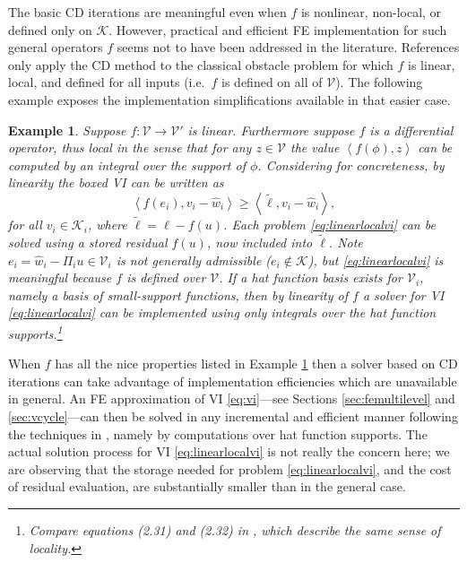 \documentclass[letterpaper,final,12pt,reqno]{amsart}
\theoremstyle{cstyle}
\theoremstyle{cstyle*}
\theoremstyle{dstyle}
\newtheorem{example}[theorem]{Example}
\numberwithin{equation}{section}
\numberwithin{figure}{section}
\numberwithin{table}{section}
\numberwithin{theorem}{section}
\newcommand{\cK}{\mathcal{K}}
\newcommand{\cV}{\mathcal{V}}
\newcommand{\ip}[2]{\left<#1,#2\right>}
\begin{document}
The basic CD iterations are meaningful even when $f$ is nonlinear, non-local, or defined only on $\cK$.  However, practical and efficient FE implementation for such general operators $f$ seems not to have been addressed in the literature.  References \cite{GraeserKornhuber2009,Tai2003} only apply the CD method to the classical obstacle problem for which $f$ is linear, local, and defined for all inputs (i.e.~$f$ is defined on all of $\mathcal{V}$).  The following example exposes the implementation simplifications available in that easier case.

\begin{example}  \label{ex:fnice} Suppose $f:\cV \to \cV'$ is linear.  Furthermore suppose $f$ is a differential operator, thus local in the sense that for any $z\in\mathcal{V}$ the value $\ip{f(\phi)}{z}$ can be computed by an integral over the support of $\phi$.  Considering  for concreteness, by linearity the boxed VI can be written as
\begin{equation}
\ip{f(e_i)}{v_i-\hat w_i} \ge \ip{\tilde\ell}{v_i-\hat w_i}, \label{eq:linearlocalvi}
\end{equation}
for all $v_i \in \mathcal{K}_i$, where $\tilde\ell = \ell - f(u)$.  Each problem \eqref{eq:linearlocalvi} can be solved using a stored residual $f(u)$, now included into $\tilde\ell$.  Note $e_i = \hat w_i - \Pi_i u \in \cV_i$ is not generally admissible ($e_i \notin \cK$), but \eqref{eq:linearlocalvi} is meaningful because $f$ is defined over $\cV$.  If a hat function basis exists for $\cV_i$, namely a basis of small-support functions, then by linearity of $f$ a solver for VI \eqref{eq:linearlocalvi} can be implemented using only integrals over the hat function supports.\footnote{Compare equations (2.31) and (2.32) in \cite{Farrelletal2021}, which describe the same sense of locality.}
\end{example}

When $f$ has all the nice properties listed in Example \ref{ex:fnice} then a solver based on CD iterations can take advantage of implementation efficiencies which are unavailable in general.  An FE approximation of VI \eqref{eq:vi}---see Sections \ref{sec:femultilevel} and \ref{sec:vcycle}---can then be solved in any incremental and efficient manner following the techniques in \cite{GraeserKornhuber2009,Tai2003}, namely by computations over hat function supports.  The actual solution process for VI \eqref{eq:linearlocalvi} is not really the concern here; we are observing that the storage needed for problem \eqref{eq:linearlocalvi}, and the cost of residual evaluation, are substantially smaller than in the general case.
\end{document}
